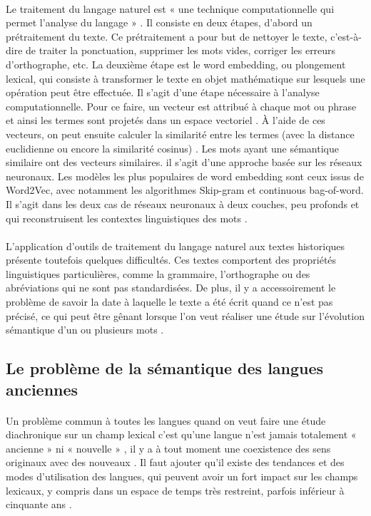 \documentclass{article}
\begin{document}
\paragraph{}
Le traitement du langage naturel est « une technique computationnelle qui permet l’analyse du langage » \cite{di2021latin}. Il consiste en deux étapes, d’abord un prétraitement du texte. Ce prétraitement a pour but de nettoyer le texte, c’est-à-dire de traiter la ponctuation, supprimer les mots vides, corriger les erreurs d’orthographe, etc. La deuxième étape est le word embedding, ou plongement lexical, qui consiste à transformer le texte en objet mathématique sur lesquels une opération peut être effectuée. Il s’agit d’une étape nécessaire à l’analyse computationnelle. Pour ce faire, un vecteur est attribué à chaque mot ou phrase et ainsi les termes sont projetés dans un espace vectoriel \cite{di2021latin}. À l’aide de ces vecteurs, on peut ensuite calculer la similarité entre les termes (avec la distance euclidienne ou encore la similarité cosinus) \cite{di2021latin}. Les mots ayant une sémantique similaire ont des vecteurs similaires. il s’agit d’une approche basée sur les réseaux neuronaux. Les modèles les plus populaires de word embedding sont ceux issus de Word2Vec, avec notamment les algorithmes Skip-gram et continuous bag-of-word. Il s’agit dans les deux cas de réseaux neuronaux à deux couches, peu profonds et qui reconstruisent les contextes linguistiques des mots \cite{liebeskind2020deep}. 
\paragraph{}
L’application d’outils de traitement du langage naturel aux textes historiques présente toutefois quelques difficultés. Ces textes comportent des propriétés linguistiques particulières, comme la grammaire, l’orthographe ou des abréviations qui ne sont pas standardisées. De plus, il y a accessoirement le problème de savoir la date à laquelle le texte a été écrit quand ce n’est pas précisé, ce qui peut être gênant lorsque l’on veut réaliser une étude sur l’évolution sémantique d’un ou plusieurs mots \cite{liebeskind2020deep}. 
\subsection{Le problème de la sémantique des langues anciennes}
\paragraph{}
Un problème commun à toutes les langues quand on veut faire une étude diachronique sur un champ lexical c’est qu’une langue n’est jamais totalement « ancienne » ni « nouvelle » \cite{liebeskind2020deep}, il y a à tout moment une coexistence des sens originaux avec des nouveaux \cite{perrone2019gasc}. Il faut ajouter qu’il existe des tendances et des modes d’utilisation des langues, qui peuvent avoir un fort impact sur les champs lexicaux, y compris dans un espace de temps très restreint, parfois inférieur à cinquante ans \cite{liebeskind2020deep}. 
\end{document}
